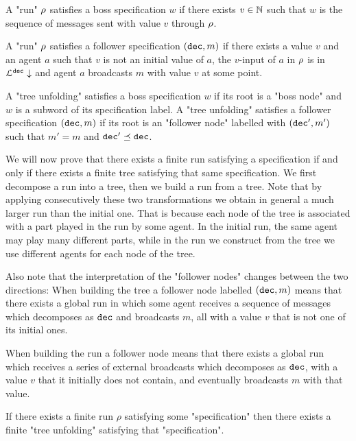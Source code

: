\begin{definition}
	A "run" $\rho$ satisfies a boss specification $w$ if there exists $v \in \mathbb{N}$ such that $w$ is the sequence of messages sent with value $v$ through $\rho$.
	
	A "run" $\rho$ satisfies a follower specification $(\mathtt{dec}, m)$ if there exists a value $v$ and an agent $a$ such that $v$ is not an initial value of $a$, the $v$-input of $a$ in $\rho$ is in $\mathcal{L}^{\mathtt{\mathtt{dec}}}\downarrow$ and agent $a$ broadcasts $m$ with value $v$ at some point.
	
	A "tree unfolding" satisfies a boss specification $w$ if its root is a "boss node" and $w$ is a subword of its specification label.
	A "tree unfolding" satisfies a follower specification $(\mathtt{dec} ,m)$ if its root is an "follower node" labelled with $(\mathtt{dec}',m')$ such that $m'=m$ and  $\mathtt{dec}' \preceq \mathtt{dec}$.
\end{definition}

We will now prove that there exists a finite run satisfying a specification if and only if there exists a finite tree satisfying that same specification.
We first decompose a run into a tree, then we build a run from a tree. Note that by applying consecutively these two transformations we obtain in general a much larger run than the initial one. That is because each node of the tree is associated with a part played in the run by some agent. In the initial run, the same agent may play many different parts, while in the run we construct from the tree we use different agents for each node of the tree.

Also note that the interpretation of the "follower nodes" changes between the two directions: When building the tree a follower node labelled $(\mathtt{dec} ,m)$ means that there exists a global run in which some agent receives a sequence of messages which decomposes as  $\mathtt{dec}$ and broadcasts $m$, all with a value $v$ that is not one of its initial ones.

When building the run a follower node means that there exists a global run which receives a series of external broadcasts which decomposes as $\mathtt{dec}$, with a value $v$ that it initially does not contain, and eventually broadcasts $m$ with that value.

\begin{lemma}
	If there exists a finite run $\rho$ satisfying some "specification" then there exists a finite "tree unfolding" satisfying that "specification".
\end{lemma}

